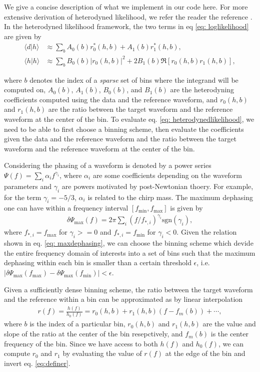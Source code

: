 \documentclass[twocolumn]{aastex631}
\begin{document}
We give a concise description of what we implement
in our code here. For more extensive  derivation of heterodyned
likelihood, we refer the reader the reference \cite{Zackay:2018qdy}.
In the heterodyned likelihood framework, the two terms in eq \ref{eq:
loglikelihood} are given by
\begin{align}
    \langle d|h \rangle &\approx \sum_b A_0(b) r^*_0(h,b) + A_1(b) r^*_1(h,b), \nonumber \\
    \langle h|h \rangle &\approx \sum_b B_0(b) |r_0(h,b)|^2 + 2 B_1(b) \Re[r_0(h,b)r_1(h,b)],
\label{eq: heterodynedlikelihood}
\end{align}

where $b$ denotes the index of a \textit{sparse} set of bins where the integrand
will be computed on, $A_0(b)$, $A_1(b)$, $B_0(b)$, and $B_1(b)$ are the
heterodyning coefficients computed using the data and the reference waveform,
and $r_0(h,b)$ and $r_1(h,b)$ are the ratio between the target waveform and the
reference waveform at the center of the bin. To evaluate eq. \ref{eq:
heterodynedlikelihood}, we need to be able to first choose a binning scheme,
then evaluate the coefficients given the data and the reference waveform and the
ratio between the target waveform and the reference waveform at the center of
the bin.

Considering the phasing of a waveform is denoted by a power series $\Psi(f) =
\sum_i \alpha_i f^{\gamma_i}$, where $\alpha_i$ are some coefficients depending
on the waveform parameters and $\gamma_i$ are powers motivated by post-Newtonian
thoery. For example, for the term $\gamma_i = -5/3$, $\alpha_i$ is related to
the chirp mass. The maximum dephasing one can have within a frequency interval $[f_{\textrm{min}},f_{\textrm{max}}]$ is given by
\begin{align}
    \delta \Psi_{\textrm{max}}(f) = 2\pi \sum_{i} (f/f_{*,i})^{\gamma_i} \textrm{sgn}(\gamma_i),
\label{eq: maxdephasing}
\end{align}
where $f_{*,i} = f_{\textrm{max}}$ for $\gamma_i>=0$ and $f_{*,i} =
f_{\textrm{min}}$ for $\gamma_i<0$. Given the relation shown in eq. \ref{eq:
maxdephasing}, we can choose the binning scheme which devide the entire
frequency domain of interests into a set of bins such that the maximum dephasing
within each bin is smaller than a certain threshold $\epsilon$, i.e.
$|\delta\Psi_{\textrm{max}}(f_{\textrm{max}}) -
\delta\Psi_{\textrm{max}}(f_{\textrm{min}})| < \epsilon$. 

Given a sufficiently dense binning scheme, the ratio between the target waveform
and the reference within a bin can be approximated as by linear interpolation
\begin{align}
r(f) = \frac{h(f)}{h_0(f)} = r_0(h,b) + r_1(h,b)(f- f_m(b)) + \cdots,
\label{eq:definer}
\end{align}
where $b$ is the index of a particular bin, $r_0(h,b)$ and $r_1(h,b)$ are the
value and slope of the ratio at the center of the bin resepctively, and
$f_m(b)$ is the center frequency of the bin. Since we have access to both $h(f)$
and $h_0(f)$, we can compute $r_0$ and $r_1$ by evaluating the value of $r(f)$
at the edge of the bin and invert eq. \ref{eq:definer}.
\end{document}
